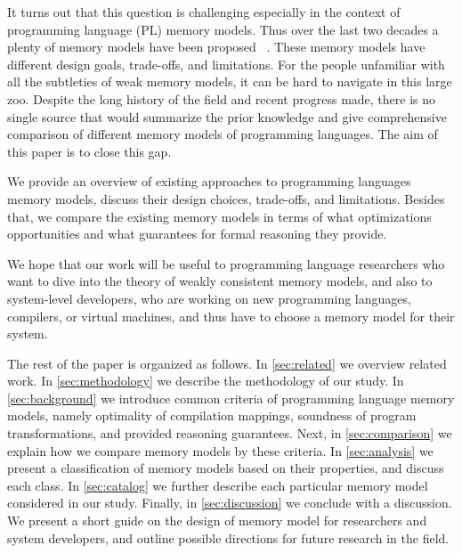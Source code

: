 It turns out that this question is challenging
especially in the context of programming language (PL) memory models.
Thus over the last two decades a plenty of memory models have been proposed~%
\cite{Manson-al:POPL05, Marino-al:PLDI10, Demange-al:POPL13, 
Batty-al:POPL11, Lahav-al:PLDI17, Dolan-al:PLDI18, Alglave-al:ASPLOS18, Watt-al:PLDI2020, 
Crary-Sullivan:POPL15, Zhang-Feng:FCS16, Jeffrey-Riely:LICS16, PichonPharabod-Sewell:POPL16, 
Kang-al:POPL17, Chakraborty-Vafeiadis:POPL19, Paviotti-al:ESOP20}. 
These memory models have different design goals, trade-offs, and limitations.
For the people unfamiliar with all the subtleties 
of weak memory models, it can be hard to navigate in this large zoo.
Despite the long history of the field and recent progress made, 
there is no single source that would summarize the prior knowledge
and give comprehensive comparison of different memory models
of programming languages. The aim of this paper is to close this gap.

We provide an overview of existing approaches to 
programming languages memory models,
discuss their design choices, trade-offs, and limitations.
Besides that, we compare the existing memory models 
in terms of what optimizations opportunities 
and what guarantees for formal reasoning they provide.

We hope that our work will be useful to programming language researchers 
who want to dive into the theory of weakly consistent memory models,
and also to system-level developers, 
who are working on new programming languages, compilers, or virtual machines, 
and thus have to choose a memory model for their system.

The rest of the paper is organized as follows.
In \cref{sec:related} we overview related work. 
In \cref{sec:methodology} we describe the methodology 
of our study. In \cref{sec:background} we 
introduce common criteria of programming language memory models,
namely optimality of compilation mappings, 
soundness of program transformations, 
and provided reasoning guarantees.
Next, in \cref{sec:comparison} we explain 
how we compare memory models by these criteria.
In \cref{sec:analysis} we present a classification
of memory models based on their properties, 
and discuss each class. 
In \cref{sec:catalog} we further describe 
each particular memory model considered in our study.
Finally, in \cref{sec:discussion} we conclude with a discussion. 
We present a short guide on the design of memory model 
for researchers and system developers,
and outline possible directions for future research in the field. 
